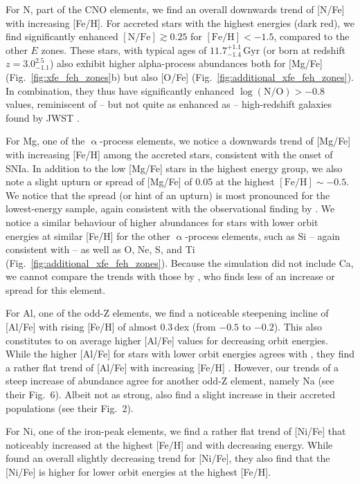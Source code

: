 \documentclass[fleqn,usenatbib]{mnras}
\begin{document}
For N, part of the CNO elements, we find an overall downwards trend of [N/Fe] with increasing [Fe/H]. For accreted stars with the highest energies (dark red), we find significantly enhanced $\mathrm{[N/Fe]} \gtrsim 0.25$ for $\mathrm{[Fe/H]} < -1.5$, compared to the other $E$ zones. These stars, with typical ages of $11.7_{-1.4}^{+1.1}\,\mathrm{Gyr}$ (or born at redshift $z = 3.0_{-1.1}^{2.5}$) also exhibit higher alpha-process abundances both for [Mg/Fe] (Fig.~\ref{fig:xfe_feh_zones}b) but also [O/Fe] (Fig.~\ref{fig:additional_xfe_feh_zones}). In combination, they thus have significantly enhanced $\log(\mathrm{N/O}) > -0.8$ values, reminiscent of -- but not quite as enhanced as -- high-redshift galaxies found by JWST \citep{Cameron2023, Senchyna2024, Ji2025}.

For Mg, one of the $\upalpha$-process elements, we notice a downwards trend of [Mg/Fe] with increasing [Fe/H] among the accreted stars, consistent with the onset of SNIa. In addition to the low [Mg/Fe] stars in the highest energy group, we also note a slight upturn or spread of [Mg/Fe] of 0.05 at the highest $\mathrm{[Fe/H]} \sim -0.5$. We notice that the spread (or hint of an upturn) is most pronounced for the lowest-energy sample, again consistent with the observational finding by \citet{Skuladottir2025}. We notice a similar behaviour of higher abundances for stars with lower orbit energies at similar [Fe/H] for the other $\upalpha$-process elements, such as Si -- again consistent with \citet{Skuladottir2025} -- as well as O, Ne, S, and Ti (Fig.~\ref{fig:additional_xfe_feh_zones}). Because the simulation did not include Ca, we cannot compare the trends with those by \citet{Skuladottir2025}, who finds less of an increase or spread for this element.

For Al, one of the odd-Z elements, we find a noticeable steepening incline of [Al/Fe] with rising [Fe/H] of almost 0.3\,dex (from $-0.5$ to $-0.2$). This also constitutes to on average higher [Al/Fe] values for decreasing orbit energies. While the higher [Al/Fe] for stars with lower orbit energies agrees with \citet{Skuladottir2025}, they find a rather flat trend of [Al/Fe] with increasing [Fe/H] \citep[see also][]{Feuillet2021, Ernandes2025}. However, our trends of a steep increase of abundance agree for another odd-Z element, namely Na (see their Fig.~6). Albeit not as strong, \citet{Belokurov2022} also find a slight increase in their accreted populations (see their Fig.~2).

For Ni, one of the iron-peak elements, we find a rather flat trend of [Ni/Fe] that noticeably increased at the highest [Fe/H] and with decreasing energy. While \citet{Skuladottir2025} found an overall slightly decreasing trend for [Ni/Fe], they also find that the [Ni/Fe] is higher for lower orbit energies at the highest [Fe/H].
\end{document}
